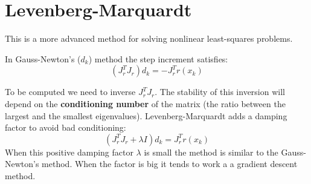 \section{Levenberg-Marquardt}

This is a more advanced method for solving nonlinear least-squares problems.

In Gauss-Newton's ($d_k$) method the step increment satisfies:
\begin{equation}
    (J_r^TJ_r)d_k = -J_r^Tr(x_k)
\end{equation}

To be computed we need to inverse $J_r^TJ_r$. The stability of this inversion will depend on the \textbf{conditioning number} of the matrix (the ratio between the largest and the smallest eigenvalues).
Levenberg-Marquardt adds a damping factor to avoid bad conditioning:
\begin{equation}
    (J_r^TJ_r + \lambda I) d_k = J_r^T r(x_k)
\end{equation}
When this positive damping factor $\lambda$ is small the method is similar to the Gauss-Newton's method. When the factor is big it tends to work a a gradient descent method.